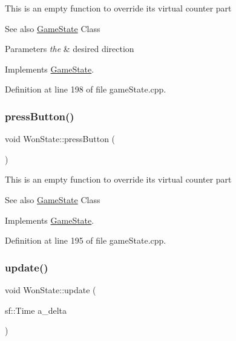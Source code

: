 This is an empty function to override it\textquotesingle{}s virtual counter part \begin{DoxySeeAlso}{See also}
\hyperlink{class_game_state}{Game\+State} Class 
\end{DoxySeeAlso}

\begin{DoxyParams}{Parameters}
{\em the} & desired direction \\
\hline
\end{DoxyParams}


Implements \hyperlink{class_game_state_aaae8c1b3ae6969eb2dd81bfc12fbf43f}{Game\+State}.



Definition at line 198 of file game\+State.\+cpp.

\mbox{\label{class_won_state_ab17f101d9ab90e60259e28b8775a76ec}} 
\subsubsection{\texorpdfstring{press\+Button()}{pressButton()}}
{\footnotesize\ttfamily void Won\+State\+::press\+Button (\begin{DoxyParamCaption}{ }\end{DoxyParamCaption})\hspace{0.3cm}{\ttfamily [virtual]}}

This is an empty function to override it\textquotesingle{}s virtual counter part \begin{DoxySeeAlso}{See also}
\hyperlink{class_game_state}{Game\+State} Class 
\end{DoxySeeAlso}


Implements \hyperlink{class_game_state_aa14eeaf244bcf19b7013af75cb722dde}{Game\+State}.



Definition at line 195 of file game\+State.\+cpp.

\mbox{\label{class_won_state_a0ea91513e3df2eafbe8ef7b9810eaff1}} 
\subsubsection{\texorpdfstring{update()}{update()}}
{\footnotesize\ttfamily void Won\+State\+::update (\begin{DoxyParamCaption}\item[{sf\+::\+Time}]{a\+\_\+delta }\end{DoxyParamCaption})\hspace{0.3cm}{\ttfamily [virtual]}}

